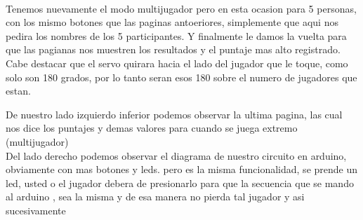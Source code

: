 \documentclass{article}
\begin{document}
{\Large \\ Tenemos nuevamente el modo multijugador pero en esta ocasion para 5 personas, con los mismo botones que las paginas antoeriores, simplemente que aqui nos pedira los nombres de los 5 participantes. Y finalmente le damos la vuelta para que las pagianas nos muestren los resultados y el puntaje mas alto registrado.  Cabe destacar que el servo quirara hacia el lado del jugador que le toque, como solo son 180 grados, por lo tanto seran esos 180 sobre el numero de jugadores que estan. 





\newpage

{\Large De nuestro lado izquierdo inferior podemos observar la ultima pagina, las cual nos dice los puntajes y demas valores para cuando se juega extremo (multijugador)\\
Del lado derecho podemos observar el diagrama de nuestro circuito en arduino, obviamente con mas botones y leds. pero es la misma funcionalidad, se prende un led, usted o el jugador debera de presionarlo para que la secuencia que se mando al arduino , sea la misma y de esa manera no pierda tal jugador y asi sucesivamente

}}
\end{document}
